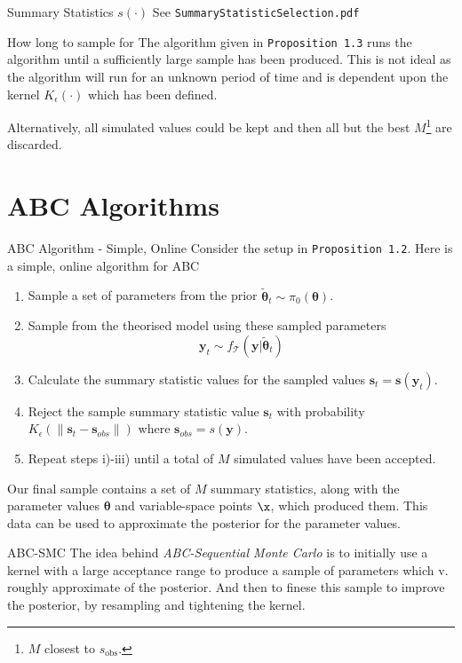 \documentclass[11pt,a4paper]{article}
\begin{document}
  \begin{proposition}{Summary Statistics $s(\cdot)$}
    See \texttt{SummaryStatisticSelection.pdf}
  \end{proposition}

  \begin{proposition}{How long to sample for}
    The algorithm given in \texttt{Proposition 1.3} runs the algorithm until a sufficiently large sample has been produced. This is not ideal as the algorithm will run for an unknown period of time and is dependent upon the kernel $K_\epsilon(\cdot)$ which has been defined.
    \par Alternatively, all simulated values could be kept and then all but the best $M$\footnote{$M$ closest to $s_\text{obs}$.} are discarded.
  \end{proposition}

\section{ABC Algorithms}

  \begin{proposition}{ABC Algorithm - Simple, Online}
    Consider the setup in \texttt{Proposition 1.2}. Here is a simple, online algorithm for ABC
    \begin{enumerate}
      \item Sample a set of parameters from the prior $\tilde{\pmb\theta}_t\sim\pi_0(\pmb\theta)$.
      \item Sample from the theorised model using these sampled parameters
      \[ \mathbf{y}_t\sim f_\mathcal{T}(\mathbf{y}|\tilde{\pmb\theta}_t) \]
      \item Calculate the summary statistic values for the sampled values $\mathbf{s}_t=\mathbf{s}(\mathbf{y}_t)$.
      \item Reject the sample summary statistic value $\mathbf{s}_t$ with probability $K_\epsilon(\|\mathbf{s}_t-\mathbf{s}_{obs}\|)$ where ${\mathbf{s}_{obs}=s(\mathbf{y})}$.
      \item Repeat steps i)-iii) until a total of $M$ simulated values have been accepted.
    \end{enumerate}
    Our final sample contains a set of $M$ summary statistics, along with the parameter values $\pmb\theta$ and variable-space points $\x$, which produced them. This data can be used to approximate the posterior for the parameter values.
  \end{proposition}

  \begin{remark}{ABC-SMC}
    The idea behind \textit{ABC-Sequential Monte Carlo} is to initially use a kernel with a large acceptance range to produce a sample of parameters which v. roughly approximate of the posterior. And then to finese this sample to improve the posterior, by resampling and tightening the kernel.
  \end{remark}
\end{document}
